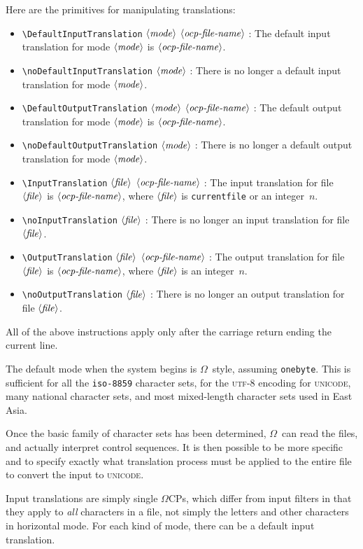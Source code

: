 \documentclass[fleqn]{article}
\newcommand{\OMEGA}{$\Omega$}
\newcommand{\OCP}{\OMEGA CP}
\newcommand{\showfile}{\langle\mbox{\emph{file}}\rangle}
\newcommand{\showmode}{\langle\mbox{\emph{mode}}\rangle}
\newcommand{\showligocp}{\langle\mbox{\emph{ocp-file-name}}\rangle}
\begin{document}
%
Here are the primitives for manipulating translations:
\begin{itemize}
\item \verb|\DefaultInputTranslation| $\showmode$ $\showligocp$ :
The default input translation for mode $\showmode$ is $\showligocp$.
\item \verb|\noDefaultInputTranslation| $\showmode$ :
There is no longer a default input translation for mode $\showmode$.
\item \verb|\DefaultOutputTranslation| $\showmode$ $\showligocp$ :
The default output translation for mode $\showmode$ is $\showligocp$.
\item \verb|\noDefaultOutputTranslation| $\showmode$ :
There is no longer a default output translation for mode $\showmode$.
\item \verb|\InputTranslation| $\showfile$ $\showligocp$ :
The input translation for file $\showfile$ is $\showligocp$,
where $\showfile$ is \verb|currentfile| or an integer~$n$.
\item \verb|\noInputTranslation| $\showfile$ :
There is no longer an input translation for file $\showfile$.
\item \verb|\OutputTranslation| $\showfile$ $\showligocp$ :
The output translation for file $\showfile$ is $\showligocp$,
where $\showfile$ is an integer~$n$.
\item \verb|\noOutputTranslation| $\showfile$ :
There is no longer an output translation for file $\showfile$.
\end{itemize}
All of the above instructions apply only after the carriage return
ending the current line.

The default mode when the system begins is \OMEGA\ style,
assuming \texttt{onebyte}.  This is sufficient for all the
\texttt{iso-8859} character sets, for the \textsc{utf-8}
encoding for \textsc{unicode}, many national character sets,
and most mixed-length character sets used in East Asia.

Once the basic family of character sets has been determined, 
\OMEGA\ can read the files, and actually interpret control sequences.
It is then possible to be more specific and to specify exactly what
translation process must be applied to the entire file to convert
the input to \textsc{unicode}.

Input translations are simply single \OCP s, which
differ from input filters in that they apply to \emph{all} characters
in a file, not simply the letters and other characters in horizontal
mode.  For each kind of mode, there can be a default input
translation.  
\end{document}
